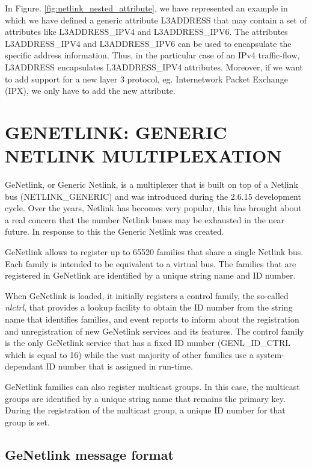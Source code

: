 \documentclass[10pt,onecolumn]{article}
\begin{document}
In Figure. \ref{fig:netlink_nested_attribute}, we have represented an example in which we have defined a generic attribute L3ADDRESS that may contain a set of attributes like L3ADDRESS\_IPV4 and L3ADDRESS\_IPV6. The attributes L3ADDRESS\_IPV4 and L3ADDRESS\_IPV6 can be used to encapsulate the specific address information. Thus, in the particular case of an IPv4 traffic-flow, L3ADDRESS encapsulates L3ADDRESS\_IPV4 attributes. Moreover, if we want to add support for a new layer 3 protocol, eg. Internetwork Packet Exchange (IPX), we only have to add the new attribute.

\section{GENETLINK: GENERIC NETLINK MULTIPLEXATION}

GeNetlink, or Generic Netlink, is a multiplexer that is built on top of a Netlink bus (NETLINK\_GENERIC) and was introduced during the 2.6.15 development cycle. Over the years, Netlink has becomes very popular, this has brought about a real concern that the number Netlink buses may be exhausted in the near future. In response to this the Generic Netlink was created.

GeNetlink allows to register up to 65520 families that share a single Netlink bus. Each family is intended to be equivalent to a virtual bus. The families that are registered in GeNetlink are identified by a unique string name and ID number.

When GeNetlink is loaded, it initially registers a control family, the so-called \textit{nlctrl}, that provides a lookup facility to obtain the ID number from the string name that identifies families, and event reports to inform about the registration and unregistration of new GeNetlink services and its features. The control family is the only GeNetlink service that has a fixed ID number (GENL\_ID\_CTRL which is equal to 16) while the vast majority of other families use a system-dependant ID number that is assigned in run-time.

GeNetlink families can also register multicast groups. In this case, the multicast groups are identified by a unique string name that remains the primary key. During the registration of the multicast group, a unique ID number for that group is set.

\subsection{GeNetlink message format}
\end{document}
